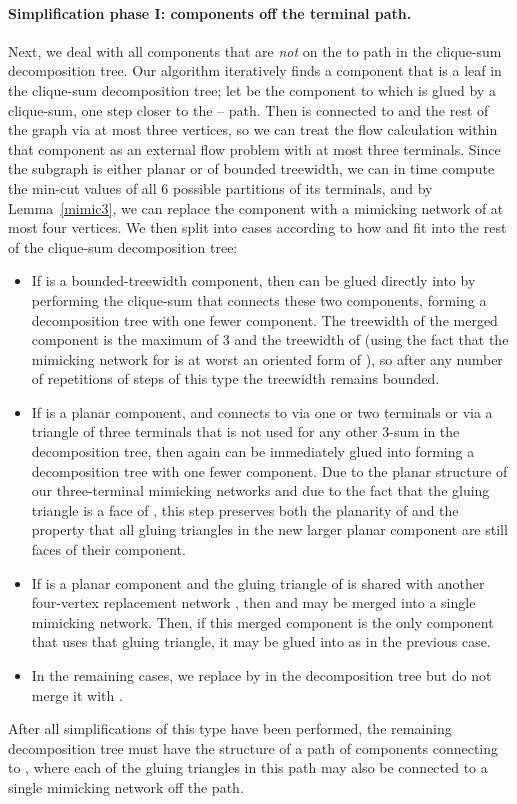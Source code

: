 \documentclass[runningheads]{llncs}
\begin{document}
\paragraph{\bf Simplification phase I: components off the terminal path.}
Next, we deal with all components that are \emph{not} on the  to  path in the clique-sum decomposition tree.  Our algorithm iteratively finds a component  that is a leaf in the clique-sum decomposition tree; let  be the component to which  is glued by a clique-sum, one step closer to the -- path.
Then  is connected to  and the rest of the graph via at most three vertices, so we can treat the flow calculation within that component as an external flow problem with at most three terminals.  Since the subgraph is either planar or of bounded treewidth, we can in  time compute the min-cut values of all 6 possible partitions of its terminals, and by Lemma~\ref{mimic3}, we can replace the component  with a mimicking network  of at most four vertices. We then split into cases according to how  and  fit into the rest of the clique-sum decomposition tree:
\begin{itemize}
\item If  is a bounded-treewidth component, then  can be glued directly into  by performing the clique-sum that connects these two components, forming a decomposition tree with one fewer component. The treewidth of the merged component is the maximum of 3 and the treewidth of  (using the fact that the mimicking network for  is at worst an oriented form of ), so after any number of repetitions of steps of this type the treewidth remains bounded.
\item If  is a planar component, and  connects to  via one or two terminals or via a triangle of three terminals that is not used for any other 3-sum in the decomposition tree, then again  can be immediately glued into  forming a decomposition tree with one fewer component. Due to the planar structure of our three-terminal mimicking networks and due to the fact that the gluing triangle is a face of , this step preserves both the planarity of  and the property that all gluing triangles in the new larger planar component are still faces of their component.
\item If  is a planar component and the gluing triangle of  is shared with another four-vertex replacement network , then  and  may be merged into a single mimicking network. Then, if this merged component is the only component that uses that gluing triangle, it may be glued into  as in the previous case.
\item In the remaining cases, we replace  by  in the decomposition tree but do not merge it with .
\end{itemize}
After all simplifications of this type have been performed, the remaining decomposition tree must have the structure of a path of components connecting  to , where each of the gluing triangles in this path may also be connected to a single mimicking network off the path.
\end{document}
